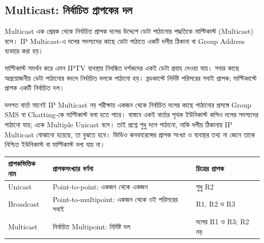 \subsection{Multicast: নির্বাচিত প্রাপকের দল}
\label{ch2:c02-13}
\begin{definitionbox}{Multicast}
এক প্রেরক থেকে নির্বাচিত প্রাপক দলের উদ্দেশে ডেটা পাঠানোর পদ্ধতিকে মাল্টিকাস্ট (Multicast) বলে। IP Multicast-এ দলের সদস্যদের কাছে ডেটা পাঠাতে একটি দলীয় ঠিকানা বা Group Address ব্যবহার করা হয়।
\end{definitionbox}
মাল্টিকাস্ট সমর্থন করে এমন IPTV ব্যবস্থায় নিবন্ধিত দর্শকদের একই ডেটা প্রবাহ দেওয়া যায়। সবার কাছে অপ্রয়োজনীয় ডেটা পাঠানোর বদলে নির্বাচিত দলকে পাঠানো হয়। ব্রডকাস্টে নির্দিষ্ট পরিসরের সবাই প্রাপক; মাল্টিকাস্টে প্রাপক একটি নির্বাচিত দল।
\begin{mistakebox}{দলগত বার্তা মানেই IP Multicast নয়}
পরীক্ষায় একজন থেকে নির্বাচিত দলের কাছে পাঠানোর প্রসঙ্গে Group SMS বা Chatting-কে মাল্টিকাস্ট বলা হতে পারে। বাস্তবে একই বার্তার পৃথক ইউনিকাস্ট কপিও দলের সদস্যদের পাঠানো যায়; একে Multiple Unicast বলে। তাই প্রশ্নে শুধু দলে পাঠানো, নাকি দলীয় ঠিকানায় IP Multicast বোঝানো হয়েছে, তা বুঝতে হবে। ভিডিও কনফারেন্সের প্রাপক সংখ্যা ও ব্যবস্থার তথ্য না জেনে তাকে নিশ্চিত ইউনিকাস্ট বা মাল্টিকাস্ট বলা যায় না।
\end{mistakebox}
\par\noindent\begin{minipage}{\linewidth}\centering
{}\end{minipage}\par
\begin{tabularx}{\linewidth}{|p{.18\linewidth}|X|X|}\hline
\textbf{প্রাপকভিত্তিক নাম} & \textbf{প্রাপকসংখ্যার বর্ণনা} & \textbf{চিত্রের প্রাপক}\\\hline
Unicast & Point-to-point: একজন থেকে একজন & শুধু R2\\\hline
Broadcast & Point-to-multipoint: একজন থেকে ওই পরিসরের সবাই & R1, R2 ও R3\\\hline
Multicast & নির্বাচিত Multipoint: নির্দিষ্ট দল & দলের R1 ও R3; R2 নয়\\\hline
\end{tabularx}
